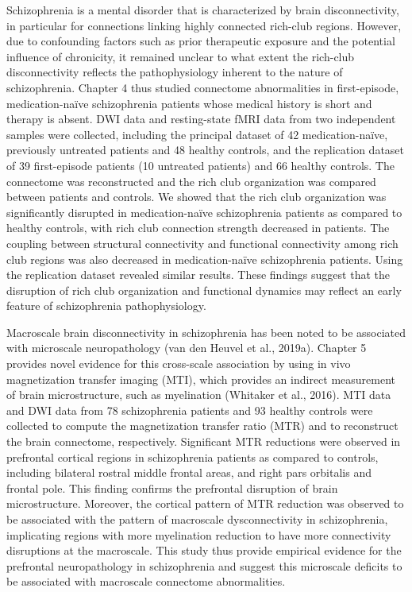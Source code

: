 \begin{refsection}
Schizophrenia is a mental disorder that is characterized by brain disconnectivity, in particular for connections linking highly connected rich-club regions. However, due to confounding factors such as prior therapeutic exposure and the potential influence of chronicity, it remained unclear to what extent the rich-club disconnectivity reflects the pathophysiology inherent to the nature of schizophrenia. Chapter 4 thus studied connectome abnormalities in first-episode, medication-naïve schizophrenia patients whose medical history is short and therapy is absent. DWI data and resting-state fMRI data from two independent samples were collected, including the principal dataset of 42 medication-naïve, previously untreated patients and 48 healthy controls, and the replication dataset of 39 first-episode patients (10 untreated patients) and 66 healthy controls. The connectome was reconstructed and the rich club organization was compared between patients and controls. We showed that the rich club organization was significantly disrupted in medication-naïve schizophrenia patients as compared to healthy controls, with rich club connection strength decreased in patients. The coupling between structural connectivity and functional connectivity among rich club regions was also decreased in medication-naïve schizophrenia patients. Using the replication dataset revealed similar results. These findings suggest that the disruption of rich club organization and functional dynamics may reflect an early feature of schizophrenia pathophysiology.

Macroscale brain disconnectivity in schizophrenia has been noted to be associated with microscale neuropathology (van den Heuvel et al., 2019a). Chapter 5 provides novel evidence for this cross-scale association by using in vivo magnetization transfer imaging (MTI), which provides an indirect measurement of brain microstructure, such as myelination (Whitaker et al., 2016). MTI data and DWI data from 78 schizophrenia patients and 93 healthy controls were collected to compute the magnetization transfer ratio (MTR) and to reconstruct the brain connectome, respectively. Significant MTR reductions were observed in prefrontal cortical regions in schizophrenia patients as compared to controls,  including bilateral rostral middle frontal areas, and right pars orbitalis and frontal pole. This finding confirms the prefrontal disruption of brain microstructure. Moreover, the cortical pattern of MTR reduction was observed to be associated with the pattern of macroscale dysconnectivity in schizophrenia, implicating regions with more myelination reduction to have more connectivity disruptions at the macroscale. This study thus provide empirical evidence for the prefrontal neuropathology in schizophrenia and suggest this microscale deficits to be associated with macroscale connectome abnormalities.


\end{refsection}

